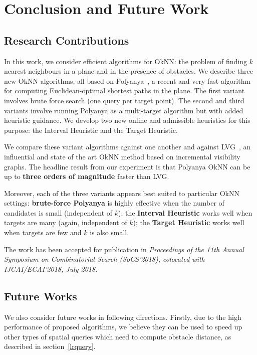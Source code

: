 \chapter{Conclusion and Future Work}\label{conclusionfuture}
\section{Research Contributions}\label{contribution}

In this work, we consider efficient algorithms for OkNN:
the problem of finding $k$ nearest neighbours in a plane and in the presence of obstacles.
We describe three new OkNN algorithms, all based on Polyanya~\cite{cuicompromise},
a recent and very fast algorithm for computing Euclidean-optimal shortest paths in the plane.
The first variant involves brute force search (one query per target point).
The second and third variants involve running Polyanya as a multi-target algorithm but with added heuristic guidance.
We develop two new online and admissible heuristics for this purpose: the Interval Heuristic and the Target Heuristic.

We compare these variant algorithms against one another and against LVG~\cite{zhang2004spatial},
an influential and state of the art OkNN method based on incremental visibility graphs.
The headline result from our experiment is that Polyanya OkNN can be up to
\textbf{three orders of magnitude} faster than LVG.

Moreover, each of the three variants appears best suited to particular OkNN settings:
\textbf{brute-force Polyanya} is highly effective when the number of candidates is small (independent of $k$);
the \textbf{Interval Heuristic} works well when targets are many (again, independent of $k$);
the \textbf{Target Heuristic} works well when targets are few and $k$ is also small.

The work has been accepted for publication in \textit{Proceedings of the 11th Annual Symposium on Combinatorial Search (SoCS’2018), colocated with
IJCAI/ECAI’2018, July 2018}.

\section{Future Works}\label{future}
We also consider future works in following directions.
Firstly, due to the high performance of proposed algorithms, we believe they can be used to
speed up other types of spatial queries which need to compute obstacle distance,
as described in section~\ref{lrquery}.

